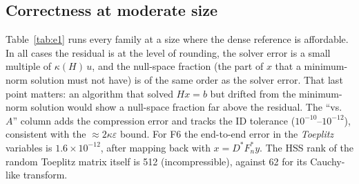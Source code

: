 \subsection{Correctness at moderate size}\label{subsec:correct}
Table~\ref{tab:e1} runs every family at a size where the dense reference is affordable. In all
cases the residual is at the level of rounding, the solver error is a small multiple of
$\kappa(H)\,u$, and the null-space fraction (the part of $x$ that a minimum-norm solution must not
have) is of the same order as the solver error. That last point matters: an algorithm that solved
$Hx=b$ but drifted from the minimum-norm solution would show a null-space fraction far above the
residual. The ``vs.\ $A$'' column adds the compression error and tracks the ID tolerance
($10^{-10}$--$10^{-12}$), consistent with the $\approx2\kappa\varepsilon$ bound. For F6 the end-to-end
error in the \emph{Toeplitz} variables is $1.6\times10^{-12}$, after mapping back with $x=D^*F_n^*y$.
The HSS rank of the random Toeplitz matrix itself is 512 (incompressible), against 62 for its
Cauchy-like transform.

\begin{table}[!htb]
\centering\scriptsize
\setlength{\tabcolsep}{3pt}

\caption{E1, solver error against the dense minimum-norm solution of the same HSS matrix
(relaxed rule, as in the current solver; the legacy rule, \texttt{slack='collapse'}, which merges a level in the
F2 $m/n=0.9$, F5 and F6 cases, gives errors of the same size). ``rank'' is the largest
generator rank, $L$ the depth.}
\label{tab:e1}
\end{table}

